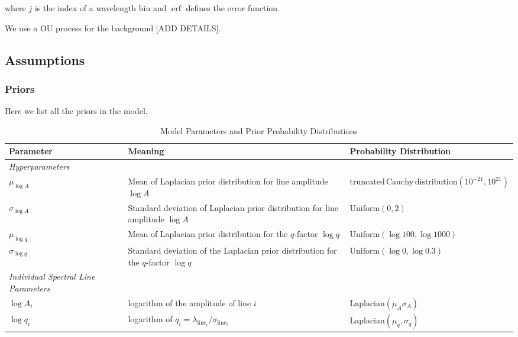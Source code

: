 \documentclass[12pt]{emulateapj}
\DeclareMathOperator\erf{erf}
\begin{document}
\noindent where $j$ is the index of a wavelength bin and $\erf$ defines the error function. 

We use a OU process for the background [ADD DETAILS].

 


\subsection{Assumptions}

\subsubsection{Priors}

Here we list all the priors in the model.


\begin{table*}[hbtp]
\renewcommand{\arraystretch}{1.3}
\footnotesize
\caption{Model Parameters and Prior Probability Distributions}
\begin{threeparttable} 
\begin{tabularx}{\textwidth}{p{4.0cm}p{7.0cm}X}%
\toprule
\bf{Parameter} & \bf{Meaning} & \bf{Probability Distribution} \\ \midrule
\it{Hyperparameters} && \\ \midrule
$\mu_{\log{A}}$ & Mean of Laplacian prior distribution for line amplitude $\log{A}$ &   $\mathrm{truncated\, Cauchy\, distribution}(10^{-21}, 10^{21})$  \\
$\sigma_{\log{A}}$ & Standard deviation of Laplacian prior distribution for line amplitude $\log{A}$ & $\mathrm{Uniform}(0,2)$ \\
$\mu_{\log{q}}$ & Mean of Laplacian prior distribution for the $q$-factor $\log{q}$ & $\mathrm{Uniform}(\log{100}, \log{1000})$  \\
$\sigma_{\log{q}}$ & Standard deviation of the Laplacian prior distribution for the $q$-factor $\log{q}$ & $\mathrm{Uniform}(\log{0}, \log{0.3})$\\ 
\midrule
\it{Individual Spectral Line Parameters} && \\ \midrule
$\log{A_i}$ & logarithm of the amplitude of line $i$ & $\mathrm{Laplacian}(\mu_A \sigma_A)$ \\
$\log{q_i}$ & logarithm of $q_i = \lambda_{\mathrm{line}_{i}}/\sigma_{\mathrm{line}_{i}}$ & $\mathrm{Laplacian}(\mu_q, \sigma_q)$ \\

\end{tabularx}
\end{threeparttable}
\end{table*}
\end{document}
